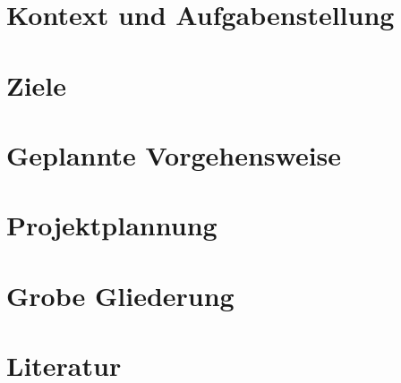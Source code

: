 \documentclass[12pt,a4paper,oneside,ngerman]{article}
\begin{document}
\section {Kontext und Aufgabenstellung}


\section {Ziele}


\section {Geplannte Vorgehensweise}


\section {Projektplannung}


\section {Grobe Gliederung}


\section {Literatur}



\end{document}

